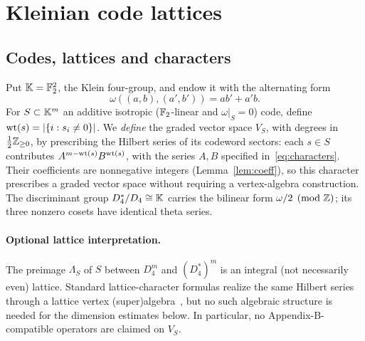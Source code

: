 \documentclass[10pt,a4paper]{article}
\numberwithin{equation}{section}
\theoremstyle{remark}\newtheorem{remark}[theorem]{Remark}\newtheorem{question}[theorem]{Question}
\begin{document}
\section{Kleinian code lattices}\label{sec:codes}
\subsection{Codes, lattices and characters}
Put $\mathbb K=\mathbb F_2^2$, the Klein four-group, and endow it with the alternating form
\[\omega((a,b),(a',b'))=ab'+a'b.\]
For $S\subset\mathbb K^m$ an additive isotropic ($\mathbb F_2$-linear and $\omega|_S=0$) code, define $\mathrm{wt}(s)=|\{i:s_i\ne0\}|$. We \emph{define} the graded vector space $V_S$, with degrees in $\frac12\mathbb Z_{\ge0}$, by prescribing the Hilbert series of its codeword sectors: each $s\in S$ contributes $A^{m-\mathrm{wt}(s)}B^{\mathrm{wt}(s)}$, with the series $A,B$ specified in~\eqref{eq:characters}. Their coefficients are nonnegative integers (Lemma~\ref{lem:coeff}), so this character prescribes a graded vector space without requiring a vertex-algebra construction. The discriminant group $D_4^*/D_4\cong\mathbb K$ carries the bilinear form $\omega/2\pmod{\mathbb Z}$; its three nonzero cosets have identical theta series.
\paragraph{Optional lattice interpretation.}
The preimage $\Lambda_S$ of $S$ between $D_4^m$ and $(D_4^*)^m$ is an integral (not necessarily even) lattice. Standard lattice-character formulas realize the same Hilbert series through a lattice vertex (super)algebra~\cite{hoehn,conwaysloane}, but no such algebraic structure is needed for the dimension estimates below. In particular, no Appendix-B-compatible operators are claimed on $V_S$.
\end{document}
